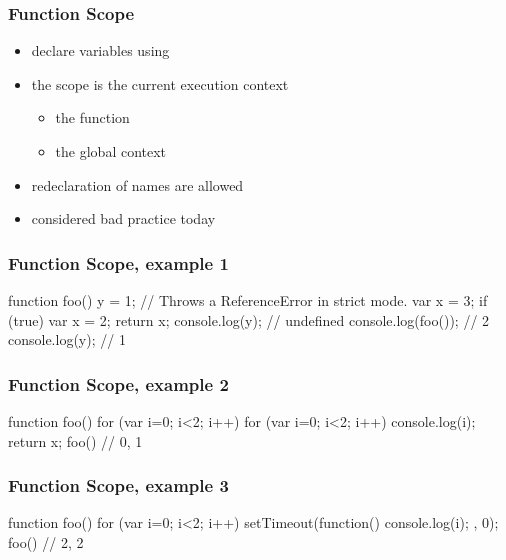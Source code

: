 \begin{frame}[fragile] \frametitle{Function Scope}
\begin{itemize}
  \item declare variables using 
  \item the scope is the current execution context
  \begin{itemize}
    \item the function
    \item the global context
  \end{itemize}
  \item redeclaration of names are allowed
  \item considered bad practice today
\end{itemize}
\end{frame}

\begin{frame}[fragile] \frametitle{Function Scope, example 1}

\begin{CodeBox}{}
function foo() {
  y = 1; // Throws a ReferenceError in strict mode.
  var x = 3;
  if (true) {
    var x = 2;
  }
  return x;
}
console.log(y); // undefined
console.log(foo()); // 2
console.log(y); // 1
\end{CodeBox}
\end{frame}

\begin{frame}[fragile] \frametitle{Function Scope, example 2}

\begin{CodeBox}{}
function foo() {
  for (var i=0; i<2; i++) {
    for (var i=0; i<2; i++) {
      console.log(i);
    }
  }
  return x;
}
foo()  // 0, 1
\end{CodeBox}
\end{frame}

\begin{frame}[fragile] \frametitle{Function Scope, example 3}

\begin{CodeBox}{}
function foo() {
  for (var i=0; i<2; i++) {
    setTimeout(function(){ console.log(i); }, 0);
  }
}
foo()  // 2, 2
\end{CodeBox}
\end{frame}

